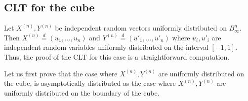 \documentclass[10pt]{amsart}
\numberwithin{equation}{section}
\begin{document}
\subsection{CLT for the cube}
\label{Subsection:CLTCube}

Let $X^{(n)},Y^{(n)}$ be independent random vectors uniformly distributed on $B_\infty ^n$. Then $X^{(n)} \overset{d}{=} (u_1,...,u_n)$ and $Y^{(n)} \overset{d}{=} (u'_1,...,u'_n)$ where $u_i, u'_i$ are independent random variables uniformly distributed on the interval $[-1,1]$. Thus, the proof of the CLT for this case is a straightforward computation.



Let us first prove that the case where $X^{(n)},Y^{(n)}$ are uniformly distributed on the cube, is asymptotically distributed as the case where $X^{(n)},Y^{(n)}$ are uniformly distributed on the boundary of the cube.
\end{document}
